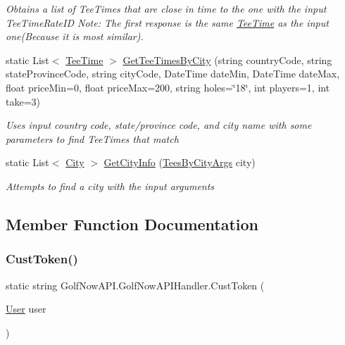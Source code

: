 \begin{DoxyCompactItemize}
\begin{DoxyCompactList}\small\item\em Obtains a list of Tee\+Times that are close in time to the one with the input Tee\+Time\+Rate\+ID Note\+: The first response is the same \mbox{\hyperlink{class_golf_now_a_p_i_1_1_tee_time}{Tee\+Time}} as the input one(\+Because it is most similar). \end{DoxyCompactList}\item 
static List$<$ \mbox{\hyperlink{class_golf_now_a_p_i_1_1_tee_time}{Tee\+Time}} $>$ \mbox{\hyperlink{class_golf_now_a_p_i_1_1_golf_now_a_p_i_handler_a99d2a8b9ee4da0a3bd0bcf4274b8ee53}{Get\+Tee\+Times\+By\+City}} (string country\+Code, string state\+Province\+Code, string city\+Code, Date\+Time date\+Min, Date\+Time date\+Max, float price\+Min=0, float price\+Max=200, string holes=\char`\"{}18\char`\"{}, int players=1, int take=3)
\begin{DoxyCompactList}\small\item\em Uses input country code, state/province code, and city name with some parameters to find Tee\+Times that match \end{DoxyCompactList}\item 
static List$<$ \mbox{\hyperlink{class_golf_now_a_p_i_1_1_city}{City}} $>$ \mbox{\hyperlink{class_golf_now_a_p_i_1_1_golf_now_a_p_i_handler_a05c9ab04974f8a19c8d32f79e60be5a1}{Get\+City\+Info}} (\mbox{\hyperlink{class_golf_now_a_p_i_1_1_tees_by_city_args}{Tees\+By\+City\+Args}} city)
\begin{DoxyCompactList}\small\item\em Attempts to find a city with the input arguments \end{DoxyCompactList}\end{DoxyCompactItemize}


\subsection{Member Function Documentation}
\mbox{\label{class_golf_now_a_p_i_1_1_golf_now_a_p_i_handler_ae2f95c14f042ab3008642f30b0b93e36}} 
\subsubsection{\texorpdfstring{CustToken()}{CustToken()}}
{\footnotesize\ttfamily static string Golf\+Now\+A\+P\+I.\+Golf\+Now\+A\+P\+I\+Handler.\+Cust\+Token (\begin{DoxyParamCaption}\item[{\mbox{\hyperlink{class_golf_now_a_p_i_1_1_user}{User}}}]{user }\end{DoxyParamCaption})\hspace{0.3cm}{\ttfamily [static]}}



